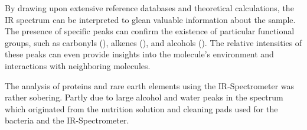 By drawing upon extensive reference databases and theoretical calculations, the IR spectrum
can be interpreted to glean valuable information about the sample.
The presence of specific peaks can confirm the existence of particular functional groups, such as carbonyls (), alkenes (), and alcohols ().
The relative intensities of these peaks can even provide insights into the molecule's environment and interactions with neighboring molecules.

The analysis of proteins and rare earth elements using the IR-Spectrometer was rather
sobering.
Partly due to large alcohol and water peaks in the spectrum which originated from the nutrition solution and cleaning pads used for the bacteria and the IR-Spectrometer.

